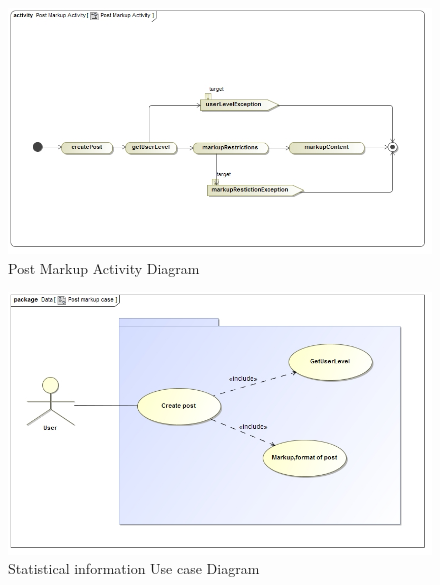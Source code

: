 \documentclass[11pt]{article}
\begin{document}
\begin{enumerate}
\graphicspath{ {../Diagrams/Matt/Activity/} }
	  \begin{figure}[H]	
    	\includegraphics[scale=0.5]{PostMarkupActivity.jpg}
    	\caption{Post Markup Activity Diagram}
	\end{figure}
	
\graphicspath{ {../Diagrams/Matt/Case/} }
	  \begin{figure}[H]	
    	\includegraphics[scale=0.5]{Postmarkupcase.jpg}
    	\caption{Statistical information Use case Diagram}
	\end{figure}


\end{enumerate}
\end{document}
